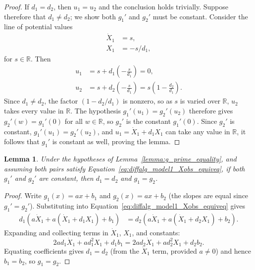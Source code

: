 \documentclass{article}
\theoremstyle{plain}
\newtheorem{lemma}{Lemma}[section]
\theoremstyle{definition}
\begin{document}
{\begin{proof}
If $d_1 = d_2$, then $u_1 = u_2$ and the conclusion holds trivially. Suppose therefore that $d_1 \neq d_2$; we show both $g_1'$ and $g_2'$ must be constant. Consider the line of potential values
\begin{align*}
    \dot{X}_1 &= s, \\
    X_1 &= -s/d_1,
\end{align*}
for $s\in\mathbb{R}$. Then
\begin{align*}
    u_1 &= s + d_1\!\left(-\frac{s}{d_1}\right) = 0, \\
    u_2 &= s + d_2\!\left(-\frac{s}{d_1}\right) = s\!\left(1 - \frac{d_2}{d_1}\right).
\end{align*}
Since $d_1 \neq d_2$, the factor $(1-d_2/d_1)$ is nonzero, so as $s$ is varied over $\mathbb{R}$, $u_2$ takes every value in $\mathbb{R}$. The hypothesis $g_1'(u_1) = g_2'(u_2)$ therefore gives $g_2'(w) = g_1'(0)$ for all $w \in \mathbb{R}$, so $g_2'$ is the constant $g_1'(0)$. Since $g_2'$ is constant,  $g_1'(u_1) = g_2'(u_2)$, and $u_1 = \dot{X}_1 + d_1 X_1$ can take any value in $\mathbb{R}$, it follows that $g_1'$ is constant as well, proving the lemma.
\end{proof}

\begin{lemma} \label{lemma:constant_g_prime}
Under the hypotheses of Lemma~\ref{lemma:g_prime_equality}, and assuming both pairs satisfy Equation~\eqref{eq:diffalg_model1_Xobs_equiveq}, if both $g_1'$ and $g_2'$ are constant, then $d_1 = d_2$ and $g_1 = g_2$.
\end{lemma}

\begin{proof}
Write $g_1(x) = ax + b_1$ and $g_2(x) = ax + b_2$ (the slopes are equal since $g_1' = g_2'$). Substituting into Equation~\eqref{eq:diffalg_model1_Xobs_equiveq} gives
\begin{align*}
    d_1(a\dot{X}_1 + a(\dot{X}_1 + d_1 X_1) + b_1) &= d_2(a\dot{X}_1 + a(\dot{X}_1 + d_2 X_1) + b_2).
\end{align*}
Expanding and collecting terms in $\dot{X}_1$, $X_1$, and constants:
\begin{equation*}
    2ad_1\dot{X}_1 + ad_1^2 X_1 + d_1 b_1 = 2ad_2\dot{X}_1 + ad_2^2 X_1 + d_2 b_2.
\end{equation*}
Equating coefficients gives $d_1 = d_2$ (from the $\dot{X}_1$ term, provided $a \neq 0$) and hence $b_1 = b_2$, so $g_1 = g_2$.
\end{proof}

}
\end{document}
